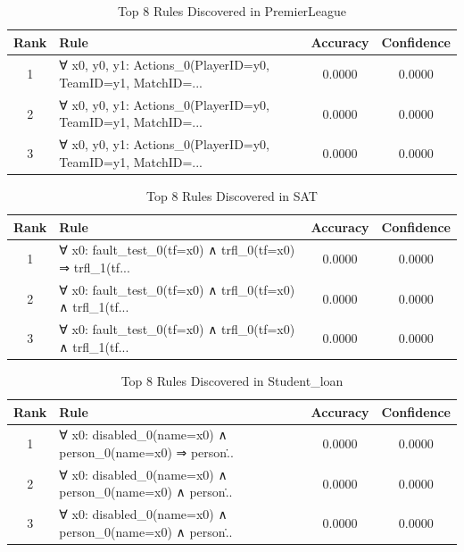 \documentclass[11pt,a4paper]{article}
\begin{document}
\begin{table}[h!]
\centering
\small
\caption{Top 8 Rules Discovered in PremierLeague}
\label{tab:rules_PremierLeague}
\begin{tabular}{|c|p{5cm}|c|c|}
\hline
\textbf{Rank} & \textbf{Rule} & \textbf{Accuracy} & \textbf{Confidence} \\
\hline
1 & ∀ x0, y0, y1: Actions\_0(PlayerID=y0, TeamID=y1, MatchID=... & 0.0000 & 0.0000 \\
2 & ∀ x0, y0, y1: Actions\_0(PlayerID=y0, TeamID=y1, MatchID=... & 0.0000 & 0.0000 \\
3 & ∀ x0, y0, y1: Actions\_0(PlayerID=y0, TeamID=y1, MatchID=... & 0.0000 & 0.0000 \\
\hline
\end{tabular}
\end{table}

\begin{table}[h!]
\centering
\small
\caption{Top 8 Rules Discovered in SAT}
\label{tab:rules_SAT}
\begin{tabular}{|c|p{5cm}|c|c|}
\hline
\textbf{Rank} & \textbf{Rule} & \textbf{Accuracy} & \textbf{Confidence} \\
\hline
1 & ∀ x0: fault\_test\_0(tf=x0) ∧ trfl\_0(tf=x0) ⇒ trfl\_1(tf... & 0.0000 & 0.0000 \\
2 & ∀ x0: fault\_test\_0(tf=x0) ∧ trfl\_0(tf=x0) ∧ trfl\_1(tf... & 0.0000 & 0.0000 \\
3 & ∀ x0: fault\_test\_0(tf=x0) ∧ trfl\_0(tf=x0) ∧ trfl\_1(tf... & 0.0000 & 0.0000 \\
\hline
\end{tabular}
\end{table}

\begin{table}[h!]
\centering
\small
\caption{Top 8 Rules Discovered in Student_loan}
\label{tab:rules_Studentloan}
\begin{tabular}{|c|p{5cm}|c|c|}
\hline
\textbf{Rank} & \textbf{Rule} & \textbf{Accuracy} & \textbf{Confidence} \\
\hline
1 & ∀ x0: disabled\_0(name=x0) ∧ person\_0(name=x0) ⇒ person\... & 0.0000 & 0.0000 \\
2 & ∀ x0: disabled\_0(name=x0) ∧ person\_0(name=x0) ∧ person\... & 0.0000 & 0.0000 \\
3 & ∀ x0: disabled\_0(name=x0) ∧ person\_0(name=x0) ∧ person\... & 0.0000 & 0.0000 \\
\hline
\end{tabular}
\end{table}
\end{document}

